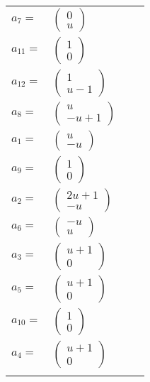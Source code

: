 \documentclass[1p]{elsarticle_modified}
\theoremstyle{definition}
\begin{document}
\begin{tabular}{m{7pt} m{180pt} m{7pt} m{180pt} }
\flushright $a_{7}=$&$\begin{pmatrix}0\\u\end{pmatrix}$ \\
\flushright $a_{11}=$&$\begin{pmatrix}1\\0\end{pmatrix}$ \\
\flushright $a_{12}=$&$\begin{pmatrix}1\\u-1\end{pmatrix}$ \\
\flushright $a_{8}=$&$\begin{pmatrix}u\\- u+1\end{pmatrix}$ \\
\flushright $a_{1}=$&$\begin{pmatrix}u\\- u\end{pmatrix}$ \\
\flushright $a_{9}=$&$\begin{pmatrix}1\\0\end{pmatrix}$ \\
\flushright $a_{2}=$&$\begin{pmatrix}2 u+1\\- u\end{pmatrix}$ \\
\flushright $a_{6}=$&$\begin{pmatrix}- u\\u\end{pmatrix}$ \\
\flushright $a_{3}=$&$\begin{pmatrix}u+1\\0\end{pmatrix}$ \\
\flushright $a_{5}=$&$\begin{pmatrix}u+1\\0\end{pmatrix}$ \\
\flushright $a_{10}=$&$\begin{pmatrix}1\\0\end{pmatrix}$ \\
\flushright $a_{4}=$&$\begin{pmatrix}u+1\\0\end{pmatrix}$\\&\end{tabular}
\end{document}

